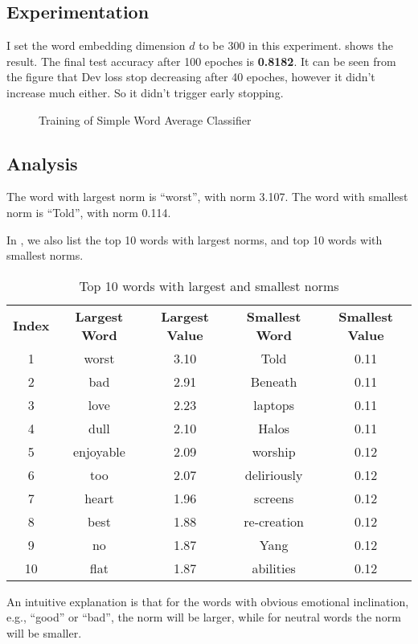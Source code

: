 \documentclass{article}
\begin{document}
\subsection{Experimentation}
I set the word embedding dimension $d$ to be 300 in this experiment.  shows the result. The final test accuracy after 100 epoches is \textbf{0.8182}. It can be seen from the figure that Dev loss stop decreasing after 40 epoches, however it didn't increase much either. So it didn't trigger early stopping.
\begin{figure}
\centering
{}
\caption{Training of Simple Word Average Classifier}
\label{fig:wordavg}
\end{figure}
\subsection{Analysis}
The word with largest norm is ``worst'', with norm 3.107.
The word with smallest norm is ``Told'', with norm 0.114.

In , we also list the top 10 words with largest norms, and top 10 words with smallest norms.
\begin{table}
\begin{tabular}{c|c|c|c|c}
\textbf{Index} & \textbf{Largest Word} & \textbf{Largest Value} & \textbf{Smallest Word} & \textbf{Smallest Value}\\
1 &worst&3.10 &Told&0.11\\
2 &bad&2.91&Beneath&0.11\\
3 &love&2.23&laptops&0.11\\
4 &dull&2.10&Halos&0.11\\
5 &enjoyable&2.09&worship&0.12\\
6 &too&2.07&deliriously&0.12\\
7 &heart&1.96&screens&0.12\\
8 &best&1.88&re-creation&0.12\\
9 &no&1.87&Yang&0.12\\
10 &flat&1.87&abilities&0.12\\
\end{tabular}
\caption{Top 10 words with largest and smallest norms}
\label{tab:topwords}
\end{table}
An intuitive explanation is that for the words with obvious emotional inclination, e.g., ``good'' or ``bad'', the norm will be larger, while for neutral words the norm will be smaller.
\end{document}
